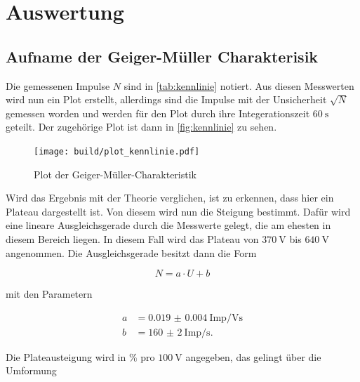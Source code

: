 \section{Auswertung}
\label{sec:Auswertung}



\subsection{Aufname der Geiger-Müller Charakterisik}
\label{ssec:a1}

Die gemessenen Impulse $N$ sind in \autoref{tab:kennlinie} notiert.
Aus diesen Messwerten wird nun ein Plot erstellt, allerdings sind die Impulse mit der Unsicherheit $\sqrt{N}$ gemessen worden und werden für den Plot durch ihre Integerationszeit $\SI{60}{\second}$ geteilt.
Der zugehörige Plot ist dann in \autoref{fig:kennlinie} zu sehen.

\begin{figure}
    \centering
    \texttt{[image: build/plot\_kennlinie.pdf]}
    \caption{Plot der Geiger-Müller-Charakteristik}
    \label{fig:kennlinie}
\end{figure}

Wird das Ergebnis mit der Theorie verglichen, ist zu erkennen, dass hier ein Plateau dargestellt ist.
Von diesem wird nun die Steigung bestimmt.
Dafür wird eine lineare Ausgleichsgerade durch die Messwerte gelegt, die am ehesten in diesem Bereich liegen.
In diesem Fall wird das Plateau von $\SI{370}{\volt}$ bis $\SI{640}{\volt}$ angenommen.
Die Ausgleichsgerade besitzt dann die Form

\begin{equation}
    N = a \cdot U + b
\end{equation}

mit den Parametern

\begin{align}
    a &= \SI{0.019(4)}{\text{Imp}\per\volt\second}\\
    b &= \SI{160(2)}{\text{Imp}\per\second}.
\end{align}

Die Plateausteigung wird in $\%$ pro $\SI{100}{\volt}$ angegeben, das gelingt über die Umformung 

